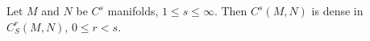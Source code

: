 Let $M$ and $N$ be $C^s$ manifolds, $1 \leqslant s \leqslant \infty$. Then $C^s(M,N)$ is dense in $C^r_S(M,N)$, $0 \leqslant r < s$.
